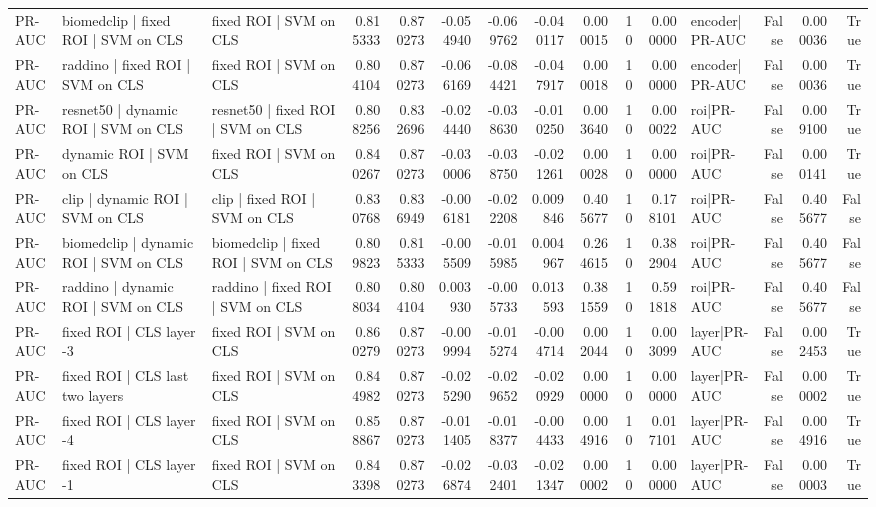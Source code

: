 \begin{table}
\begin{tabular}{lllrrrrrrrrlrrr}
PR-AUC & biomedclip | fixed ROI | SVM on CLS & fixed ROI | SVM on CLS & 0.815333 & 0.870273 & -0.054940 & -0.069762 & -0.040117 & 0.000015 & 10 & 0.000000 & encoder|PR-AUC & False & 0.000036 & True \\
PR-AUC & raddino | fixed ROI | SVM on CLS & fixed ROI | SVM on CLS & 0.804104 & 0.870273 & -0.066169 & -0.084421 & -0.047917 & 0.000018 & 10 & 0.000000 & encoder|PR-AUC & False & 0.000036 & True \\
PR-AUC & resnet50 | dynamic ROI | SVM on CLS & resnet50 | fixed ROI | SVM on CLS & 0.808256 & 0.832696 & -0.024440 & -0.038630 & -0.010250 & 0.003640 & 10 & 0.000022 & roi|PR-AUC & False & 0.009100 & True \\
PR-AUC & dynamic ROI | SVM on CLS & fixed ROI | SVM on CLS & 0.840267 & 0.870273 & -0.030006 & -0.038750 & -0.021261 & 0.000028 & 10 & 0.000000 & roi|PR-AUC & False & 0.000141 & True \\
PR-AUC & clip | dynamic ROI | SVM on CLS & clip | fixed ROI | SVM on CLS & 0.830768 & 0.836949 & -0.006181 & -0.022208 & 0.009846 & 0.405677 & 10 & 0.178101 & roi|PR-AUC & False & 0.405677 & False \\
PR-AUC & biomedclip | dynamic ROI | SVM on CLS & biomedclip | fixed ROI | SVM on CLS & 0.809823 & 0.815333 & -0.005509 & -0.015985 & 0.004967 & 0.264615 & 10 & 0.382904 & roi|PR-AUC & False & 0.405677 & False \\
PR-AUC & raddino | dynamic ROI | SVM on CLS & raddino | fixed ROI | SVM on CLS & 0.808034 & 0.804104 & 0.003930 & -0.005733 & 0.013593 & 0.381559 & 10 & 0.591818 & roi|PR-AUC & False & 0.405677 & False \\
PR-AUC & fixed ROI | CLS layer -3 & fixed ROI | SVM on CLS & 0.860279 & 0.870273 & -0.009994 & -0.015274 & -0.004714 & 0.002044 & 10 & 0.003099 & layer|PR-AUC & False & 0.002453 & True \\
PR-AUC & fixed ROI | CLS last two layers & fixed ROI | SVM on CLS & 0.844982 & 0.870273 & -0.025290 & -0.029652 & -0.020929 & 0.000000 & 10 & 0.000000 & layer|PR-AUC & False & 0.000002 & True \\
PR-AUC & fixed ROI | CLS layer -4 & fixed ROI | SVM on CLS & 0.858867 & 0.870273 & -0.011405 & -0.018377 & -0.004433 & 0.004916 & 10 & 0.017101 & layer|PR-AUC & False & 0.004916 & True \\
PR-AUC & fixed ROI | CLS layer -1 & fixed ROI | SVM on CLS & 0.843398 & 0.870273 & -0.026874 & -0.032401 & -0.021347 & 0.000002 & 10 & 0.000000 & layer|PR-AUC & False & 0.000003 & True \\

\end{tabular}
\end{table}
